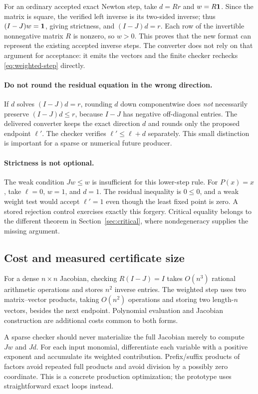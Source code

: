 For an ordinary accepted exact Newton step, take $d=Rr$ and $w=R\mathbf 1$. Since the matrix is square, the verified left inverse is its two-sided inverse; thus $(I-J)w=\mathbf 1$, giving strictness, and $(I-J)d=r$. Each row of the invertible nonnegative matrix $R$ is nonzero, so $w>0$. This proves that the new format can represent the existing accepted inverse steps. The converter does not rely on that argument for acceptance: it emits the vectors and the finite checker rechecks \eqref{eq:weighted-step} directly.

\paragraph{Do not round the residual equation in the wrong direction.}
If $d$ solves $(I-J)d=r$, rounding $d$ down componentwise does \emph{not} necessarily preserve $(I-J)d\le r$, because $I-J$ has negative off-diagonal entries. The delivered converter keeps the exact direction $d$ and rounds only the proposed endpoint $\ell'$. The checker verifies $\ell'\le\ell+d$ separately. This small distinction is important for a sparse or numerical future producer.

\paragraph{Strictness is not optional.}
The weak condition $Jw\le w$ is insufficient for this lower-step rule. For $P(x)=x$, take $\ell=0$, $w=1$, and $d=1$. The residual inequality is $0\le0$, and a weak weight test would accept $\ell'=1$ even though the least fixed point is zero. A stored rejection control exercises exactly this forgery. Critical equality belongs to the different theorem in Section~\ref{sec:critical}, where nondegeneracy supplies the missing argument.

\subsection{Cost and measured certificate size}
For a dense $n\times n$ Jacobian, checking $R(I-J)=I$ takes $O(n^3)$ rational arithmetic operations and stores $n^2$ inverse entries. The weighted step uses two matrix--vector products, taking $O(n^2)$ operations and storing two length-$n$ vectors, besides the next endpoint. Polynomial evaluation and Jacobian construction are additional costs common to both forms.

A sparse checker should never materialize the full Jacobian merely to compute $Jw$ and $Jd$. For each input monomial, differentiate each variable with a positive exponent and accumulate its weighted contribution. Prefix/suffix products of factors avoid repeated full products and avoid division by a possibly zero coordinate. This is a concrete production optimization; the prototype uses straightforward exact loops instead.

